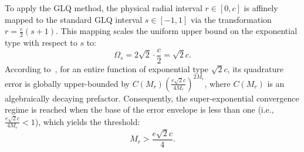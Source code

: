 \documentclass[lettersize,journal]{IEEEtran}
\theoremstyle{plain}
\begin{document}
To apply the GLQ method, the physical radial interval $r \in [0, c]$ is affinely mapped to the standard GLQ interval $s \in [-1, 1]$ via the transformation $r = \frac{c}{2}(s+1)$. This mapping scales the uniform upper bound on the exponential type with respect to $s$ to:
$$
	\Omega_s = 2\sqrt{2} \cdot \frac{c}{2} = \sqrt{2}c.
$$
According to~\cite[Theorem 1]{Yan2026Computational}, for an entire function of exponential type $\sqrt{2}c$, its quadrature error is globally upper-bounded by $C(M_r)\left(\frac{e\sqrt{2}c}{4M_r}\right)^{2M_r}$, where $C(M_r)$ is an algebraically decaying prefactor. Consequently, the super-exponential convergence regime is reached when the base of the error envelope is less than one (i.e., $\frac{e\sqrt{2}c}{4M_r} < 1$), which yields the threshold:
$$
	M_r > \frac{e\sqrt{2}c}{4}.
	\label{eq:M_r_threshold}
$$
	
\end{document}
